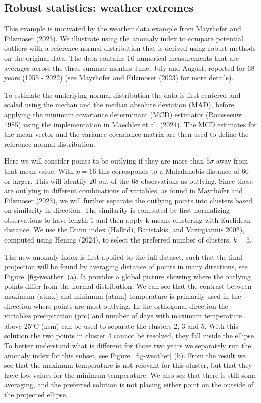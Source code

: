 \documentclass[
  12pt,
]{interact}
\begin{document}
\subsection{Robust statistics: weather
extremes}\label{robust-statistics-weather-extremes}

This example is motivated by the weather data example from Mayrhofer and
Filzmoser (2023). We illustrate using the anomaly index to compare
potential outliers with a reference normal distribution that is derived
using robust methods on the original data. The data contains 16
numerical measurements that are averages across the three summer months
June, July and August, reported for 68 years (1955 - 2022) (see
Mayrhofer and Filzmoser (2023) for more details).

To estimate the underlying normal distribution the data is first
centered and scaled using the median and the median absolute deviation
(MAD), before applying the minimum covariance determinant (MCD)
estimator (Rousseeuw 1985) using the implementation in Maechler et al.
(2024). The MCD estimates for the mean vector and the
variance-covariance matrix are then used to define the reference normal
distribution.

Here we will consider points to be outlying if they are more than
\(5 \sigma\) away from that mean value. With \(p=16\) this corresponds
to a Mahalanobis distance of \(60\) or larger. This will identify \(20\)
out of the \(68\) observations as outlying. Since these are outlying in
different combinations of variables, as found in Mayrhofer and Filzmoser
(2023), we will further separate the outlying points into clusters based
on similarity in direction. The similarity is computed by first
normalizing observations to have length \(1\) and then apply k-means
clustering with Euclidean distance. We use the Dunn index (Halkidi,
Batistakis, and Vazirgiannis 2002), computed using Hennig (2024), to
select the preferred number of clusters, \(k=5\).

The new anomaly index is first applied to the full dataset, such that
the final projection will be found by averaging distance of points in
many directions, see Figure~\ref{fig-weather} (a). It provides a global
picture showing where the outlying points differ from the normal
distribution. We can see that the contrast between maximum (atmx) and
minimum (atmn) temperature is primarily used in the direction where
points are most outlying. In the orthogonal direction the variables
precipitation (prc) and number of days with maximum temperature above
25°C (nsm) can be used to separate the clusters 2, 3 and 5. With this
solution the two points in cluster 4 cannot be resolved, they fall
inside the ellipse. To better understand what is different for those two
years we separately run the anomaly index for this subset, see
Figure~\ref{fig-weather} (b). From the result we see that the maximum
temperature is not relevant for this cluster, but that they have low
values for the minimum temperature. We also see that there is still some
averaging, and the preferred solution is not placing either point on the
outside of the projected ellipse.
\end{document}
